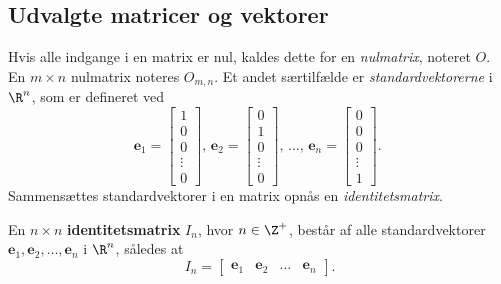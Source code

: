 \subsection{Udvalgte matricer og vektorer} 
% 
Hvis alle indgange i en matrix er nul, kaldes dette for en \textit{nulmatrix}, noteret $O$. 
En $m \times n$ nulmatrix noteres $O_{m,n}$.
%
Et andet særtilfælde er \textit{standardvektorerne} i $\R^n$, som er defineret ved  
$$
\textbf{e}_1=
\begin{bmatrix}
1 \\ 
0 \\
0 \\
\vdots \\
0
\end{bmatrix}
\text{, }
\textbf{e}_2=
\begin{bmatrix}
0 \\ 
1 \\
0 \\
\vdots \\
0
\end{bmatrix}
\text{, }
\ldots
\text{, }
\textbf{e}_n=
\begin{bmatrix}
0 \\ 
0 \\
0 \\
\vdots \\
1
\end{bmatrix}
\text{. }
$$
%
Sammensættes standardvektorer i en matrix opnås en \textit{identitetsmatrix}.
%
\begin{defn}{}{}
%
En $n \times n$ \textbf{identitetsmatrix} $I_n$, hvor $n \in \Z^+$, består af alle standardvektorer $\textbf{e}_1, \textbf{e}_2, \ldots, \textbf{e}_n$ i $\R^n$, således at
$$
I_n=
\begin{bmatrix}
\textbf{e}_1 & \textbf{e}_2 & \ldots & \textbf{e}_n
\end{bmatrix}.
$$ 
\end{defn}
\noindent
%
